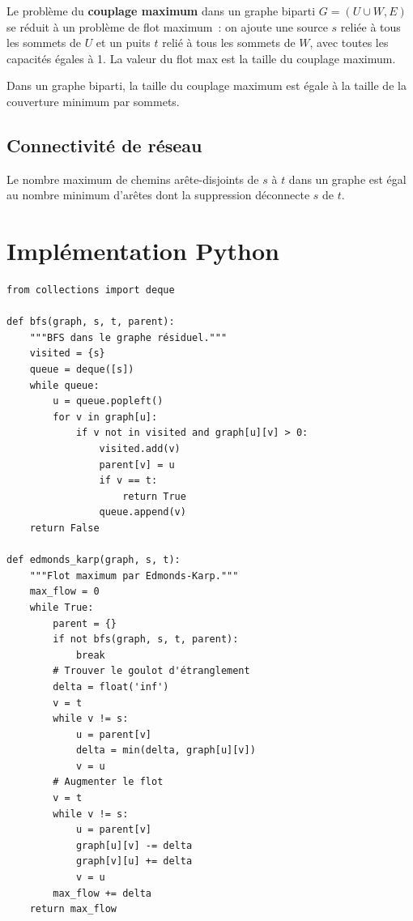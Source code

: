 \begin{proposition}
Le probl\`eme du \textbf{couplage maximum} dans un graphe biparti
$G = (U \cup W, E)$ se r\'eduit \`a un probl\`eme de flot maximum~: on ajoute
une source $s$ reli\'ee \`a tous les sommets de $U$ et un puits $t$ reli\'e \`a
tous les sommets de $W$, avec toutes les capacit\'es \'egales \`a 1. La valeur
du flot max est la taille du couplage maximum.
\end{proposition}

\begin{theoreme}[K\"onig]
Dans un graphe biparti, la taille du couplage maximum est \'egale \`a la taille
de la couverture minimum par sommets.
\end{theoreme}

\subsection{Connectivit\'e de r\'eseau}

\begin{proposition}
Le nombre maximum de chemins ar\^ete-disjoints de $s$ \`a $t$ dans un graphe
est \'egal au nombre minimum d'ar\^etes dont la suppression d\'econnecte $s$
de $t$.
\end{proposition}

\section{Impl\'ementation Python}

\begin{codeblock}[title=\textbf{Ford-Fulkerson / Edmonds-Karp}]
\begin{verbatim}
from collections import deque

def bfs(graph, s, t, parent):
    """BFS dans le graphe résiduel."""
    visited = {s}
    queue = deque([s])
    while queue:
        u = queue.popleft()
        for v in graph[u]:
            if v not in visited and graph[u][v] > 0:
                visited.add(v)
                parent[v] = u
                if v == t:
                    return True
                queue.append(v)
    return False

def edmonds_karp(graph, s, t):
    """Flot maximum par Edmonds-Karp."""
    max_flow = 0
    while True:
        parent = {}
        if not bfs(graph, s, t, parent):
            break
        # Trouver le goulot d'étranglement
        delta = float('inf')
        v = t
        while v != s:
            u = parent[v]
            delta = min(delta, graph[u][v])
            v = u
        # Augmenter le flot
        v = t
        while v != s:
            u = parent[v]
            graph[u][v] -= delta
            graph[v][u] += delta
            v = u
        max_flow += delta
    return max_flow
\end{verbatim}
\end{codeblock}

